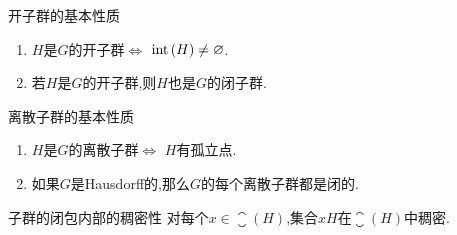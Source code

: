 \begin{corollary}{开子群的基本性质}{}
	\begin{enumerate}
		\item $H$是$G$的开子群$\iff$ $\operatorname{int}\left(H\right)\neq\varnothing$.
		\item 若$H$是$G$的开子群,则$H$也是$G$的闭子群.
	\end{enumerate}
\end{corollary}

\begin{proposition}{离散子群的基本性质}{}
	\begin{enumerate}
		\item $H$是$G$的离散子群$\iff$ $H$有孤立点.
		\item 如果$G$是Hausdorff的,那么$G$的每个离散子群都是闭的.
	\end{enumerate}
\end{proposition}

\begin{remark}{子群的闭包内部的稠密性}{}
	对每个$x\in\closure\left(H\right)$,集合$xH$在$\closure\left(H\right)$中稠密.	
\end{remark}


















